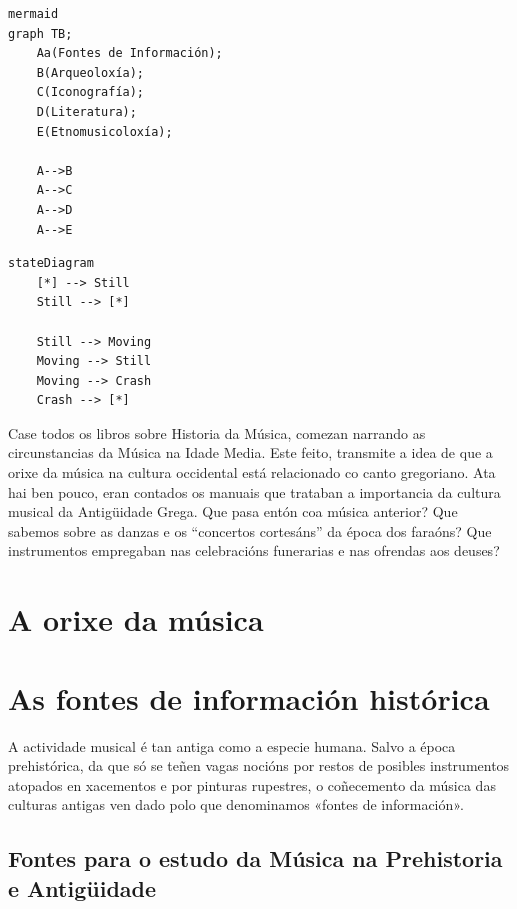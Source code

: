 \documentclass[a4paper, twoside]{templates/ociamthesis}
\theoremstyle{definition}
\theoremstyle{definition}
\theoremstyle{definition}
\theoremstyle{definition}
\theoremstyle{remark}
\begin{document}
\begin{verbatim}
mermaid
graph TB;
    Aa(Fontes de Información);
    B(Arqueoloxía);
    C(Iconografía);
    D(Literatura);
    E(Etnomusicoloxía);
    
    A-->B
    A-->C
    A-->D
    A-->E
\end{verbatim}

\begin{verbatim}
stateDiagram
    [*] --> Still
    Still --> [*]

    Still --> Moving
    Moving --> Still
    Moving --> Crash
    Crash --> [*]
\end{verbatim}

Case todos os libros sobre Historia da Música, comezan narrando as circunstancias da Música na Idade Media. Este feito, transmite a idea de que a orixe da música na cultura occidental está relacionado co canto gregoriano. Ata hai ben pouco, eran contados os manuais que trataban a importancia da cultura musical da Antigüidade Grega. Que pasa entón coa música anterior? Que sabemos sobre as danzas e os ``concertos cortesáns'' da época dos faraóns? Que instrumentos empregaban nas celebracións funerarias e nas ofrendas aos deuses?

\hypertarget{a-orixe-da-muxfasica}{%
\section{A orixe da música}\label{a-orixe-da-muxfasica}}

\hypertarget{as-fontes-de-informaciuxf3n-histuxf3rica-1}{%
\section*{As fontes de información histórica}\label{as-fontes-de-informaciuxf3n-histuxf3rica-1}}

A actividade musical é tan antiga como a especie humana. Salvo a época prehistórica, da que só se teñen vagas nocións por restos de posibles instrumentos atopados en xacementos e por pinturas rupestres, o coñecemento da música das culturas antigas ven dado polo que denominamos «fontes de información».

\hypertarget{fontes-para-o-estudo-da-muxfasica-na-prehistoria-e-antiguxfcidade-1}{%
\subsection*{Fontes para o estudo da Música na Prehistoria e Antigüidade}\label{fontes-para-o-estudo-da-muxfasica-na-prehistoria-e-antiguxfcidade-1}}
\end{document}
